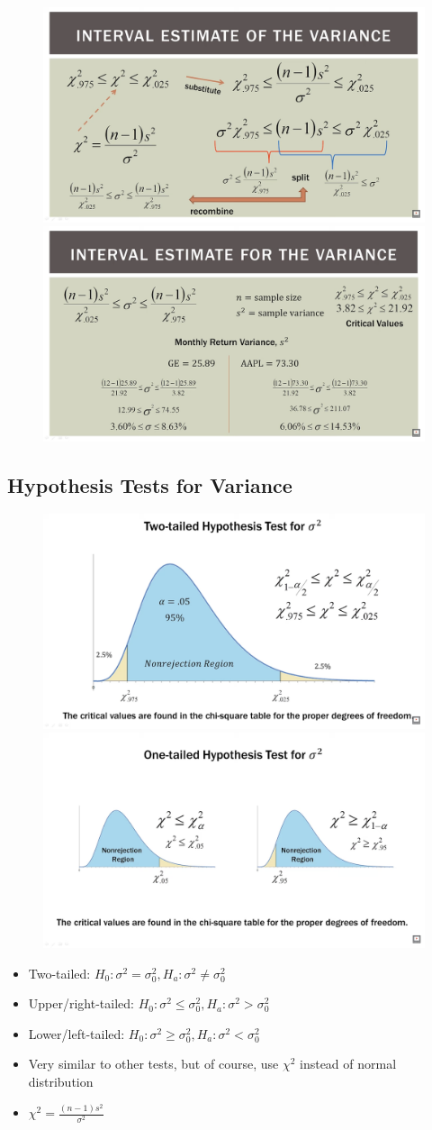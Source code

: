 \documentclass{article}
\begin{document}
\begin{figure}[H]
    \centering
    \includegraphics[width=0.45\linewidth]{civarianceexample.png}
    \hfill %
    \includegraphics[width=0.45\linewidth]{civarianceexample2.png}
\end{figure}

\subsection{Hypothesis Tests for Variance}

\begin{figure}[H]
    \centering
    \includegraphics[width=0.45\linewidth]{varhtesttwotail.png}
    \hfill %
    \includegraphics[width=0.45\linewidth]{varhtestonetail.png}
\end{figure}

\begin{itemize}
    \item Two-tailed: $H_0: \sigma^2 = \sigma_0^2, H_a: \sigma^2 \ne \sigma_0^2$
    \item Upper/right-tailed: $H_0: \sigma^2 \leq \sigma_0^2, H_a: \sigma^2 > \sigma_0^2$
    \item Lower/left-tailed: $H_0: \sigma^2 \geq \sigma_0^2, H_a: \sigma^2 < \sigma_0^2$
    \item Very similar to other tests, but of course, use $\chi^2$ instead of normal distribution
    \item $\chi^2=\frac{(n-1)s^2}{\sigma^2}$
\end{itemize}
\end{document}
